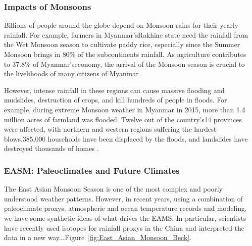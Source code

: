 \subsubsection{Impacts of Monsoons}

Billions of people around the globe depend on Monsoon rains for their yearly rainfall. For example, farmers in Myanmar'sRakhine state need the rainfall from the Wet Monsoon season to cultivate paddy rice, especially since the Summer Monsoon brings in 80\% of the subcontinents rainfall. As agriculture contributes to 37.8\% of Myanmar'seconomy, the arrival of the Monsoon season is crucial to the livelihoods of many citizens of Myanmar \citep{monsoonimpact}.

However, intense rainfall in these regions can cause massive flooding and mudslides, destruction of crops, and kill hundreds of people in floods. For example, during extreme Monsoon weather in Myanmar in 2015,  more than 1.4 million acres of farmland was flooded. Twelve out of the country's14 provinces were affected, with northern and western regions suffering the hardest blows.385,000 households have been displaced by the floods, and landslides have destroyed thousands of homes \citep{monsoonimpact}.

\subsubsection{EASM: Paleoclimates and Future Climates}

The East Asian Monsoon Season is one of the most complex and poorly understood weather patterns. However, in recent years, using a combination of paleoclimate proxys, atmospheric and ocean temperature records and modeling, we have some synthetic ideas of what drives the EAMS. In particular, scientists have recently used  isotopes for rainfall proxys in the China and interpreted the data in a new way...Figure~\ref{fig:East_Asian_Monsoon_Beck}.

\citet{beck2018550} %

